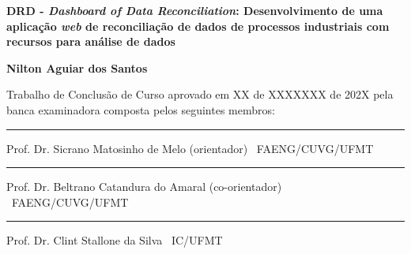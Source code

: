 %
%

\begin{titlepage}

\begin{center}

\LARGE

\textbf{DRD - \textit{Dashboard of Data Reconciliation}: Desenvolvimento de uma aplicação \textit{web} de reconciliação de dados de processos industriais com recursos para análise de dados}

\vfill

\Large

\textbf{Nilton Aguiar dos Santos}

\end{center}

\vfill

\noindent
Trabalho de Conclusão de Curso
aprovado em XX de XXXXXXX de 202X pela banca examinadora composta
pelos seguintes membros:


\begin{center}

\vspace{1.5cm}\rule{0.95\linewidth}{1pt}
\parbox{0.9\linewidth}{%
Prof. Dr. Sicrano Matosinho de Melo (orientador) \dotfill\ FAENG/CUVG/UFMT}

\vspace{1.5cm}\rule{0.95\linewidth}{1pt}
\parbox{0.9\linewidth}{%
Prof. Dr. Beltrano Catandura do Amaral (co-orientador) \dotfill\ FAENG/CUVG/UFMT}

\vspace{1.5cm}\rule{0.95\linewidth}{1pt}
\parbox{0.9\linewidth}{%
Prof. Dr. Clint Stallone da Silva \dotfill\ IC/UFMT}


\end{center}

\end{titlepage}


